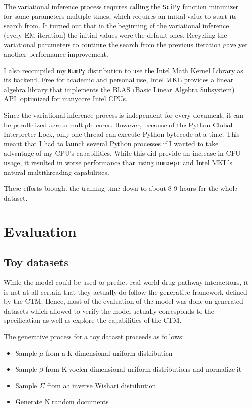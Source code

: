 \documentclass[12pt,a4paper,twoside,openright]{report}
\begin{document}
The variational inference process requires calling the \texttt{SciPy} function minimizer for some parameters multiple times, which requires an initial value to start its search from. It turned out that in the beginning of the variational inference (every EM iteration) the initial values were the default ones. Recycling the variational parameters to continue the search from the previous iteration gave yet another performance improvement.

I also recompiled my \texttt{NumPy} distribution to use the Intel Math Kernel Library as its backend. Free for academic and personal use, Intel MKL provides a linear algebra library that implements the BLAS (Basic Linear Algebra Subsystem) API, optimized for manycore Intel CPUs.

Since the variational inference process is independent for every document, it can be parallelized across multiple cores. However, because of the Python Global Interpreter Lock, only one thread can execute Python bytecode at a time. This meant that I had to launch several Python processes if I wanted to take advantage of my CPU's capabilities. While this did provide an increase in CPU usage, it resulted in worse performance than using \texttt{numxepr} and Intel MKL's natural multithreading capabilities.

These efforts brought the training time down to about 8-9 hours for the whole dataset.

\chapter{Evaluation}

\section{Toy datasets}

While the model could be used to predict real-world drug-pathway interactions, it is not at all certain that they actually do follow the generative framework defined by the CTM. Hence, most of the evaluation of the model was done on generated datasets which allowed to verify the model actually corresponds to the specification as well as explore the capabilities of the CTM.

The generative process for a toy dataset proceeds as follows:

\begin{itemize}[noitemsep]
\item Sample $\mu$ from a K-dimensional uniform distribution
\item Sample $\beta$ from K voclen-dimensional uniform distributions and normalize it
\item Sample $\Sigma$ from an inverse Wishart distribution
\item Generate N random documents
\end{itemize}
\end{document}
